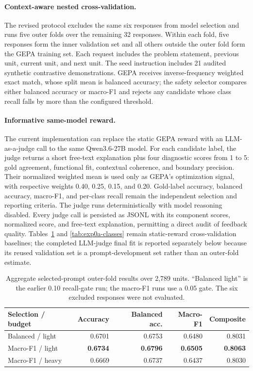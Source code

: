 \paragraph{Context-aware nested cross-validation.}
The revised protocol excludes the same six responses from model selection and
runs five outer folds over the remaining 32 responses.  Within each fold,
five responses form the inner validation set and all others outside the outer
fold form the GEPA training set.  Each request includes the problem statement,
previous unit, current unit, and next unit.  The seed instruction includes 21
audited synthetic contrastive demonstrations.  GEPA receives inverse-frequency
weighted exact match, whose split mean is balanced accuracy; the safety
selector compares either balanced accuracy or macro-F1 and rejects any
candidate whose class recall falls by more than the configured threshold.

\paragraph{Informative same-model reward.}
The current implementation can replace the static GEPA reward with an
LLM-as-a-judge call to the same Qwen3.6-27B model.  For each candidate label,
the judge returns a short free-text explanation plus four diagnostic scores
from 1 to 5: gold agreement, functional fit, contextual coherence, and boundary
precision.  Their normalized weighted mean is used only as GEPA's optimization
signal, with respective weights 0.40, 0.25, 0.15, and 0.20.  Gold-label
accuracy, balanced accuracy, macro-F1, and per-class recall remain the
independent selection and reporting criteria.  The judge runs deterministically
with model reasoning disabled.  Every judge call is persisted as JSONL with
its component scores, normalized score, and free-text explanation, permitting
a direct audit of feedback quality.  Tables~\ref{tab:exp0a-cv} and
\ref{tab:exp0a-classes} remain static-reward cross-validation baselines; the
completed LLM-judge final fit is reported separately below because its reused
validation set is a prompt-development set rather than an outer-fold estimate.

\begin{table}[t]
\centering
\caption{Aggregate selected-prompt outer-fold results over 2,789 units.
``Balanced light'' is the earlier 0.10 recall-gate run; the macro-F1 runs use a
0.05 gate.  The six excluded responses were not evaluated.
}
\label{tab:exp0a-cv}
\begin{tabular}{lrrrr}
\toprule
Selection / budget & Accuracy & Balanced acc. & Macro-F1 & Composite \\
\midrule
Balanced / light & 0.6701 & 0.6753 & 0.6480 & 0.8031 \\
Macro-F1 / light & \textbf{0.6734} & \textbf{0.6796} &
\textbf{0.6505} & \textbf{0.8063} \\
Macro-F1 / heavy & 0.6669 & 0.6737 & 0.6437 & 0.8030 \\
\bottomrule
\end{tabular}
\end{table}

